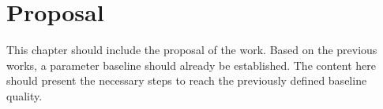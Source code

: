 \chapter[Proposal]{Proposal}

This chapter should include the proposal of the work. Based on the previous works, a parameter baseline should already be established. The content here should present the necessary steps to reach the previously defined baseline quality.
